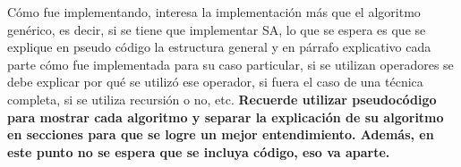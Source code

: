 Cómo fue implementando, interesa la implementación más que el algoritmo
genérico, es decir, si se tiene que implementar SA, lo que se espera
es que se explique en pseudo código la estructura general y en párrafo
explicativo cada parte cómo fue implementada para su caso particular,
si se utilizan operadores se debe explicar por qué se utilizó ese
operador, si fuera el caso de una técnica completa, si se utiliza
recursión o no, etc. \textbf{Recuerde utilizar pseudocódigo para mostrar
cada algoritmo y separar la explicación de su algoritmo en secciones
para que se logre un mejor entendimiento. Además, en este punto no
se espera que se incluya código, eso va aparte.}